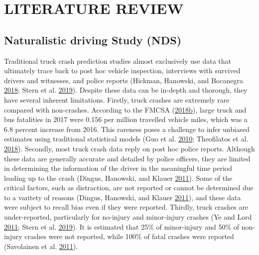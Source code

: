 \documentclass[12pt]{book}
\numberwithin{equation}{chapter}
\begin{document}
\hypertarget{literature-review}{%
\chapter{LITERATURE REVIEW}\label{literature-review}}

\hypertarget{naturalistic-driving-study-nds}{%
\section{Naturalistic driving Study (NDS)}\label{naturalistic-driving-study-nds}}

Traditional truck crash prediction studies almost exclusively use data that ultimately trace back to post hoc vehicle inspection, interviews with survived drivers and witnesses, and police reports (Hickman, Hanowski, and Bocanegra \protect\hyperlink{ref-hickman2018synthetic}{2018}; Stern et al. \protect\hyperlink{ref-stern2019data}{2019}). Despite these data can be in-depth and thorough, they have several inherent limitations. Firstly, truck crashes are extremely rare compared with non-crashes. According to the FMCSA (\protect\hyperlink{ref-fmcsareport2017}{2018}\protect\hyperlink{ref-fmcsareport2017}{b}), large truck and bus fatalities in 2017 were 0.156 per million travelled vehicle miles, which was a 6.8 percent increase from 2016. This rareness poses a challenge to infer unbiased estimates using traditional statistical models (Guo et al. \protect\hyperlink{ref-guo2010near}{2010}; Theofilatos et al. \protect\hyperlink{ref-theofilatos2018impact}{2018}). Secondly, most truck crash data reply on post hoc police reports. Although these data are generally accurate and detailed by police officers, they are limited in determining the information of the driver in the meaningful time period leading up to the crash (Dingus, Hanowski, and Klauer \protect\hyperlink{ref-dingus2011estimating}{2011}). Some of the critical factors, such as distraction, are not reported or cannot be determined due to a varitety of reasons (Dingus, Hanowski, and Klauer \protect\hyperlink{ref-dingus2011estimating}{2011}), and these data were subject to recall bias even if they were reported. Thirdly, truck crashes are under-reported, particularly for no-injury and minor-injury crashes (Ye and Lord \protect\hyperlink{ref-ye2011investigation}{2011}; Stern et al. \protect\hyperlink{ref-stern2019data}{2019}). It is estimated that 25\% of minor-injury and 50\% of non-injury crashes were not reported, while 100\% of fatal crashes were reported (Savolainen et al. \protect\hyperlink{ref-savolainen2011statistical}{2011}).
\end{document}
